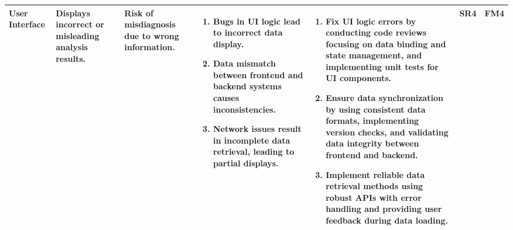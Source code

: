\documentclass{article}
\begin{document}
\begin{landscape}
\begin{table}[ht]
{\begin{tabular}{|p{2.5cm}|p{2.5cm}|p{3cm}|p{5cm}|p{6cm}|p{1cm}|p{1cm}|}
    User Interface
     & Displays incorrect or misleading analysis results.
     & Risk of misdiagnosis due to wrong information.
     &
     \begin{enumerate}[leftmargin=*, label={\alph*.}, itemsep=1pt]
         \item Bugs in UI logic lead to incorrect data display.
         \item Data mismatch between frontend and backend systems causes inconsistencies.
         \item Network issues result in incomplete data retrieval, leading to partial displays.
     \end{enumerate}
     &
     \begin{enumerate}[leftmargin=*, label={\alph*.}, itemsep=1pt]
         \item Fix UI logic errors by conducting code reviews focusing on data binding and state management, and implementing unit tests for UI components.
         \item Ensure data synchronization by using consistent data formats, implementing version checks, and validating data integrity between frontend and backend.
         \item Implement reliable data retrieval methods using robust APIs with error handling and providing user feedback during data loading.
     \end{enumerate}
     & SR4 & FM4 \\ \hline

    \end{tabular}
    }
    \end{table}
\end{landscape}
\end{document}
